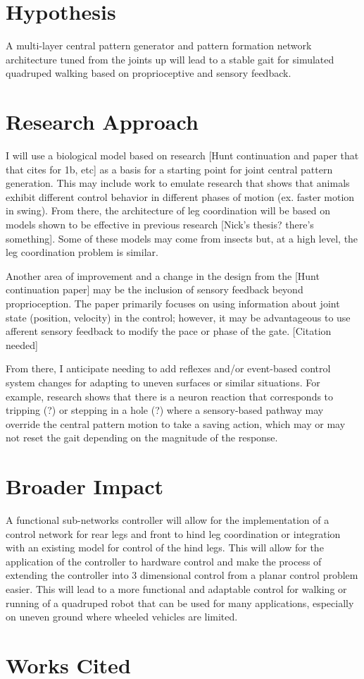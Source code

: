 \documentclass[12pt, letterpaper, oneside, notitlepage, onecolumn]{article}
\begin{document}
\section{Hypothesis}

A multi-layer central pattern generator and pattern formation network architecture tuned from the joints up will lead to a stable gait for simulated quadruped walking based on proprioceptive and sensory feedback.

\section{Research Approach}

I will use a biological model based on research [Hunt continuation and paper that that cites for 1b, etc] as a basis for a starting point for joint central pattern generation. This may include work to emulate research that shows that animals exhibit different control behavior in different phases of motion (ex. faster motion in swing). From there, the architecture of leg coordination will be based on models shown to be effective in previous research [Nick's thesis? there's something]. Some of these models may come from insects but, at a high level, the leg coordination problem is similar.

Another area of improvement and a change in the design from the [Hunt continuation paper] may be the inclusion of sensory feedback beyond proprioception. The paper primarily focuses on using information about joint state (position, velocity) in the control; however, it may be advantageous to use afferent sensory feedback to modify the pace or phase of the gate. [Citation needed]

From there, I anticipate needing to add reflexes and/or event-based control system changes for adapting to uneven surfaces or similar situations. For example, research shows that there is a neuron reaction that corresponds to tripping (?) or stepping in a hole (?) where a sensory-based pathway may override the central pattern motion to take a saving action, which may or may not reset the gait depending on the magnitude of the response.

\section{Broader Impact}

A functional sub-networks controller will allow for the implementation of a control network for rear legs and front to hind leg coordination or integration with an existing model for control of the hind legs. This will allow for the application of the controller to hardware control and make the process of extending the controller into 3 dimensional control from a planar control problem easier. This will lead to a more functional and adaptable control for walking or running of a quadruped robot that can be used for many applications, especially on uneven ground where wheeled vehicles are limited.


\newpage

\section{Works Cited}

\end{document}
